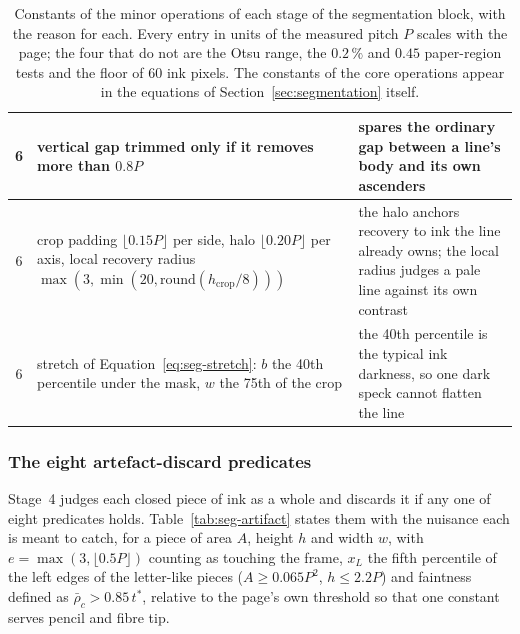 \begin{table}[!htbp]
\begin{tabularx}{\linewidth}{|c|p{5.1cm}|X|}
\hline
6 & vertical gap trimmed only if it removes more than $0.8P$ & spares the ordinary gap between a line's body and its own ascenders \\
\hline
6 & crop padding $\lfloor0.15P\rfloor$ per side, halo $\lfloor0.20P\rfloor$ per axis, local recovery radius $\max(3,\min(20,\mathrm{round}(h_{\mathrm{crop}}/8)))$ & the halo anchors recovery to ink the line already owns; the local radius judges a pale line against its own contrast \\
\hline
6 & stretch of Equation~\ref{eq:seg-stretch}: $b$ the 40th percentile under the mask, $w$ the 75th of the crop & the 40th percentile is the typical ink darkness, so one dark speck cannot flatten the line \\
\hline
\end{tabularx}
\caption{Constants of the minor operations of each stage of the segmentation block, with the reason for each. Every entry in units of the measured pitch $P$ scales with the page; the four that do not are the Otsu range, the $0.2\,\%$ and $0.45$ paper-region tests and the floor of 60 ink pixels. The constants of the core operations appear in the equations of Section~\ref{sec:segmentation} itself.}
\label{tab:seg-const}
\end{table}

\subsubsection{The eight artefact-discard predicates}

Stage~4 judges each closed piece of ink as a whole and discards it if any one of eight predicates holds.
Table~\ref{tab:seg-artifact} states them with the nuisance each is meant to catch, for a piece of area $A$, height $h$ and width $w$, with $e=\max(3,\lfloor0.5P\rfloor)$ counting as touching the frame, $x_L$ the fifth percentile of the left edges of the letter-like pieces ($A\ge0.065P^2$, $h\le2.2P$) and faintness defined as $\bar\rho_c>0.85\,t^*$, relative to the page's own threshold so that one constant serves pencil and fibre tip.

